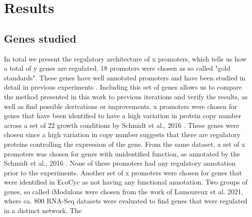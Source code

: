 \section{Results}
\subsection{Genes studied}
In total we present the regulatory architecture of x promoters, which tells us how a total of y genes are regulated. 18 promoters were chosen as so called "gold standards". These genes have well annotated promoters and have been studied in detail in previous experiments \cite{belliveau2018systematic,ireland2020deciphering}. Including this set of genes allows us to compare the method presented in this work to previous iterations and verify the results, as well as find possible derivations or improvements. x promoters were chosen for genes that have been identified to have a high variation in protein copy number  across a set of 22 growth conditions by Schmidt et al., 2016 \cite{schmidt2016quantitative}. These genes were chosen since a high variation in copy number suggests that there are regulatory proteins controlling the expression of the gene. From the same dataset, a set of x promoters was chosen for genes with unidentified function, as annotated by the Schmidt et al., 2016 \cite{schmidt2016quantitative}. None of these promoters had any regulatory annotation prior to the experiments. Another set of x promoters were chosen for genes that were identified in EcoCyc as not having any functional annotation. Two groups of genes, so called iModulons \cite{lamoureux2021precise} were chosen from the work of Lamoureux et al. 2021, where ca. 800 RNA-Seq datasets were evaluated to find genes that were regulated in a distinct network.  The 


